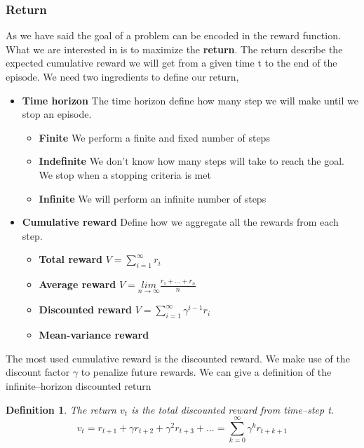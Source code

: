 \documentclass[main.tex]{subfiles}
\newtheorem{definition}{Definition}[section]
\begin{document}
\subsubsection{Return}
As we have said the goal of a problem can be encoded in the reward function. What we are interested in is to maximize the \textbf{return}. The return describe the expected cumulative reward we will get from a given time t to the end of the episode. We need two ingredients to define our return,
\begin{itemize}
    \item \textbf{Time horizon} The time horizon define how many step we will make until we stop an episode.
          \begin{itemize}
              \item \textbf{Finite} We perform a finite and fixed number of steps
              \item \textbf{Indefinite} We don't know how many steps will take to reach the goal. We stop when a stopping criteria is met
              \item \textbf{Infinite} We will perform an infinite number of steps
          \end{itemize}
    \item \textbf{Cumulative reward} Define how we aggregate all the rewards from each step.
          \begin{itemize}
              \item \textbf{Total reward} $V = \sum_{i=1}^{\infty} r_i$
              \item \textbf{Average reward} $V = \underset{n \rightarrow \infty}{lim} \frac{r_1 + \dots + r_n}{n}$
              \item \textbf{Discounted reward} $V = \sum_{i=1}^{\infty} \gamma^{i-1} r_i$
              \item \textbf{Mean-variance reward}
          \end{itemize}
\end{itemize}
The most used cumulative reward is the discounted reward. We make use of the discount factor $\gamma$ to penalize future rewards. We can give a definition of the infinite–horizon discounted return
\begin{definition}
    The return $v_t$ is the total discounted reward from time–step t.
    \begin{equation}
        v_t = r_{t+1} + \gamma r_{t+2} + \gamma^2 r_{t+3} + \dots = \sum_{k=0}^{\infty} \gamma^k r_{t+k+1}
    \end{equation}
\end{definition}
\end{document}

